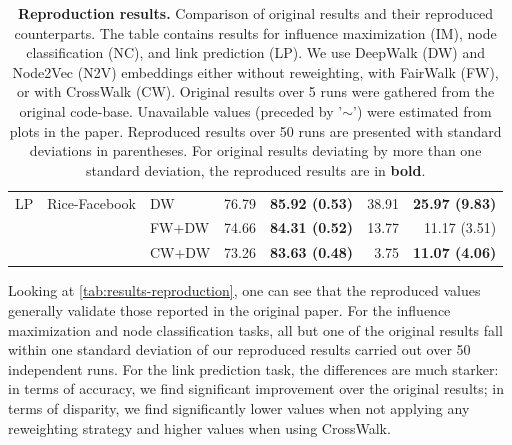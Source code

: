 \begin{table}[!tb]
{\begin{tabular}{lllrrrr}
        \midrule
        LP & Rice-Facebook & DW    & 76.79 & \textbf{85.92 (0.53)} & 38.91 & \textbf{25.97 (9.83)} \\
           &               & FW+DW & 74.66 & \textbf{84.31 (0.52)} & 13.77 & 11.17 (3.51) \\
           &               & CW+DW & 73.26 & \textbf{83.63 (0.48)} & 3.75  & \textbf{11.07 (4.06)} \\
        \bottomrule
    \end{tabular}}
    \caption{\textbf{Reproduction results.} Comparison of original results and their reproduced counterparts. The table contains results for influence maximization (IM), node classification (NC), and link prediction (LP). We use DeepWalk (DW) and Node2Vec (N2V) embeddings either without reweighting, with FairWalk (FW), or with CrossWalk (CW). Original results over 5 runs were gathered from the original code-base. Unavailable values (preceded by '$\sim$') were estimated from plots in the paper. Reproduced results over 50 runs are presented with standard deviations in parentheses. For original results deviating by more than one standard deviation, the reproduced results are in \textbf{bold}.}
    \label{tab:results-reproduction}
\end{table}



Looking at \autoref{tab:results-reproduction}, one can see that the reproduced values generally validate those reported in the original paper. For the influence maximization and node classification tasks, all but one of the original results fall within one standard deviation of our reproduced results carried out over 50 independent runs. For the link prediction task, the differences are much starker: in terms of accuracy, we find significant improvement over the original results; in terms of disparity, we find significantly lower values when not applying any reweighting strategy and higher values when using CrossWalk.

